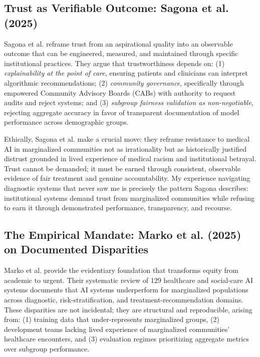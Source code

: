 \documentclass[12pt,a4paper]{article}
\begin{document}
\subsection{Trust as Verifiable Outcome: Sagona et al. (2025)}

Sagona et al. reframe trust from an aspirational quality into an observable outcome that can be engineered, measured, and maintained through specific institutional practices.\cite{sagona2025} They argue that trustworthiness depends on: (1) \textit{explainability at the point of care}, ensuring patients and clinicians can interpret algorithmic recommendations; (2) \textit{community governance}, specifically through empowered Community Advisory Boards (CABs) with authority to request audits and reject systems; and (3) \textit{subgroup fairness validation as non-negotiable}, rejecting aggregate accuracy in favor of transparent documentation of model performance across demographic groups.\cite{sagona2025}

Ethically, Sagona et al. make a crucial move: they reframe resistance to medical AI in marginalized communities not as irrationality but as historically justified distrust grounded in lived experience of medical racism and institutional betrayal.\cite{sagona2025} Trust cannot be demanded; it must be earned through consistent, observable evidence of fair treatment and genuine accountability.\cite{sagona2025} My experience navigating diagnostic systems that never saw me is precisely the pattern Sagona describes: institutional systems demand trust from marginalized communities while refusing to earn it through demonstrated performance, transparency, and recourse.\cite{garcia_ed415}

\subsection{The Empirical Mandate: Marko et al. (2025) on Documented Disparities}

Marko et al. provide the evidentiary foundation that transforms equity from academic to urgent. Their systematic review of 129 healthcare and social-care AI systems documents that AI systems underperform for marginalized populations across diagnostic, risk-stratification, and treatment-recommendation domains.\cite{marko2025} These disparities are not incidental; they are structural and reproducible, arising from: (1) training data that under-represents marginalized groups, (2) development teams lacking lived experience of marginalized communities' healthcare encounters, and (3) evaluation regimes prioritizing aggregate metrics over subgroup performance.\cite{marko2025}
\end{document}

